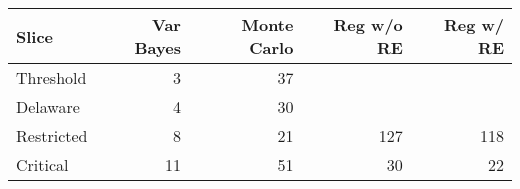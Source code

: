 \begin{tabular}{lrrrr}
  \hline
Slice & Var Bayes & Monte Carlo & Reg w/o RE & Reg w/ RE \\ 
  \hline
  Threshold & 3 & 37 & ~ & ~ \\ 
  Delaware & 4 & 30 & ~ & ~ \\ 
  Restricted & 8 & 21 & 127 & 118 \\ 
  Critical & 11 & 51 & 30 & 22 \\ 
  \hline
\end{tabular}
